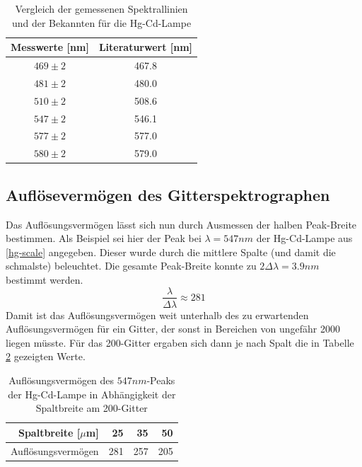 		\begin{table}
			\center
			\caption{Vergleich der gemessenen Spektrallinien und der Bekannten für die Hg-Cd-Lampe}
			\label{tab:hg-1}
			\begin{tabular}{c|c}
				Messwerte [nm] & Literaturwert [nm] \\
				\hline
				$469 \pm 2$ & 467.8 \\
				$481 \pm 2$ & 480.0 \\
				$510 \pm 2$ & 508.6 \\
				$547 \pm 2$ & 546.1 \\
				$577 \pm 2$ & 577.0 \\
				$580 \pm 2$ & 579.0 \\
			\end{tabular}
		\end{table}


	\subsection{Auflösevermögen des Gitterspektrographen} %
	\label{sub:aufl_severm_gen_des_gitterspektrographen}

		Das Auflösungsvermögen lässt sich nun durch Ausmessen der halben Peak-Breite bestimmen.
		Als Beispiel sei hier der Peak bei $\lambda = 547\unit{nm}$ der Hg-Cd-Lampe aus \ref{hg-scale} angegeben.
		Dieser wurde durch die mittlere Spalte (und damit die schmalste) beleuchtet.
		Die gesamte Peak-Breite konnte zu $2\Delta \lambda = 3.9\unit{nm}$ bestimmt werden.
		\[ \frac{\lambda}{\Delta \lambda} \approx 281 \]
		Damit ist das Auflösungsvermögen weit unterhalb des zu erwartenden Auflösungsvermögen für ein Gitter, der sonst in Bereichen von ungefähr 2000 liegen müsste.
		Für das 200-Gitter ergaben sich dann je nach Spalt die in Tabelle \ref{tab:200-gitter-aufloesung} gezeigten Werte.

		\begin{table}
			\center
			\caption{Auflösungsvermögen des $547\unit{nm}$-Peaks der Hg-Cd-Lampe in Abhängigkeit der Spaltbreite am 200-Gitter}
			\label{tab:200-gitter-aufloesung}
			\begin{tabular}{r|r|r|r}
				Spaltbreite [$\mu$m] & 25 & 35 & 50 \\
				\hline
				Auflösungsvermögen & 281 & 257 & 205
			\end{tabular}
		\end{table}

